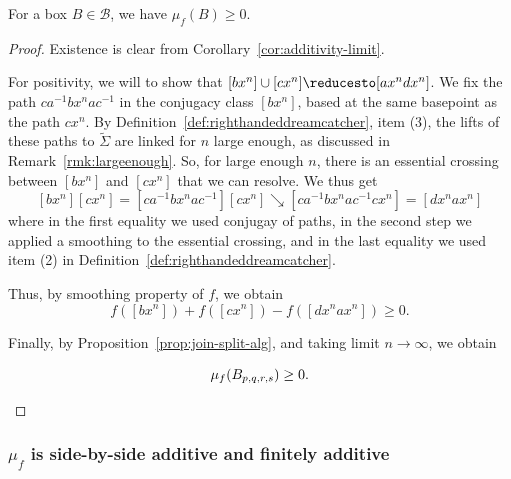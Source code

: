 \begin{proposition}
  For a box $B\in \mathcal{B}$, we have $\mu_f(B) \geq 0$.
  \label{prop:positivity}
  \end{proposition}

\begin{proof}
  Existence is clear from Corollary~\ref{cor:additivity-limit}.

  For positivity, we will to show that $[b x^n] \cup [c x^n] \reducesto [a x^nd x^n]$.
  We fix the path $ca^{-1}bx^nac^{-1}$ in the conjugacy class $[bx^n]$, based at the same basepoint as the path $cx^n$.
  By Definition~\ref{def:righthandeddreamcatcher}, item (3), the lifts of these paths to $\tilde{\Sigma}$ are linked for $n$ large enough, as discussed in Remark~\ref{rmk:largeenough}.
 So, for large enough $n$, there is an essential crossing between $[bx^n]$ and $[cx^n]$ that we can resolve.
  We thus get
  \[
     [bx^n][cx^n] = [ca^{-1}bx^nac^{-1}][cx^n] \searrow [ca^{-1}bx^nac^{-1}cx^n] = [dx^nax^n]
  \]  
  where in the first equality we used conjugay of paths, in the second step we applied a smoothing to the essential crossing, and in the last equality we used item (2) in  Definition~\ref{def:righthandeddreamcatcher}.
  
   Thus, by smoothing property of $f$, we obtain
\[
f([bx^n]) + f([cx^n]) -f([dx^nax^n]) \geq 0.
\]
  
  Finally, by Proposition~\ref{prop:join-split-alg}, and taking limit $n \to \infty$, we obtain
  
  \[
  \mu_f(B_{p,q,r,s}) \geq 0. \qedhere
  \]
  

 \begin{figure}
  \end{figure}
\end{proof}

\subsubsection{$\mu_f$ is side-by-side additive and finitely additive}

